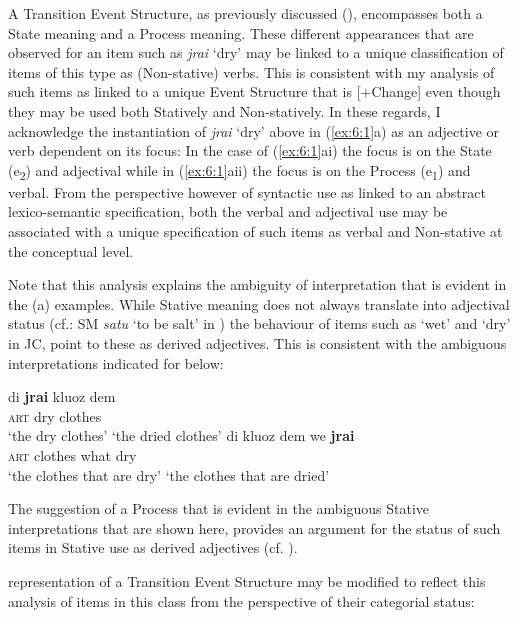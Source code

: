 A Transition Event Structure, as previously discussed (), encompasses both a State meaning and a Process meaning. These different appearances that are observed for an item such as \textit{jrai} `dry' may be linked to a unique classification of items of this type as (Non-stative) verbs. This is consistent with my analysis of such items as linked to a unique Event Structure that is [+Change] even though they may be used both Statively and Non-statively. In these regards, I acknowledge the instantiation of \textit{jrai} `dry' above in (\ref{ex:6:1}a) as an adjective or verb dependent on its focus: In the case of (\ref{ex:6:1}ai) the focus is on the State (e\textsubscript{2}) and adjectival while in (\ref{ex:6:1}aii) the focus is on the Process (e\textsubscript{1}) and verbal. From the perspective however of syntactic use as linked to an abstract lexico-semantic specification, both the verbal and adjectival use may be associated with a unique specification of such items as verbal and Non-stative at the conceptual level. 

Note that this analysis explains the ambiguity of interpretation that is evident in the (a) examples. While Stative meaning does not always translate into adjectival status (cf.: SM \textit{satu} `to be salt' in \citealt{Kouwenberg1996}) the behaviour of items such as `wet' and `dry' in JC, point to these as derived adjectives. This is consistent with the ambiguous interpretations indicated for  below: 

\ea%
\label{ex:6:3}
 \ea
 \gll di \textbf{jrai} kluoz dem\\
 \textsc{art} dry clothes {\PL}\\
 \ea \glt `the dry clothes' 
 \ex \glt `the dried clothes'
 \z
 \ex
 \gll di kluoz dem we \textbf{jrai}\\
 \textsc{art} clothes {\PL} what dry \\
 \ea `the clothes that are dry'
 \ex `the clothes that are dried'
 \z
 \z 
\z

The suggestion of a Process that is evident in the ambiguous Stative interpretations that are shown here, provides an argument for the status of such items in Stative use as derived adjectives (cf. \citealt{Kouwenberg1996}). 

 representation of a Transition Event Structure may be modified to reflect this analysis of items in this class from the perspective of their categorial status: 

\ea%
\label{ex:6:4}

